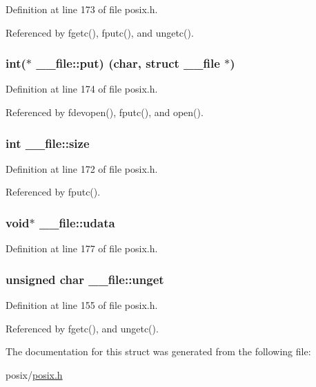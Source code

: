 Definition at line 173 of file posix.\+h.



Referenced by fgetc(), fputc(), and ungetc().

\subsubsection[{\texorpdfstring{put}{put}}]{\setlength{\rightskip}{0pt plus 5cm}int($\ast$ \+\_\+\+\_\+file\+::put) (char, struct {\bf \+\_\+\+\_\+file} $\ast$)}\hypertarget{struct____file_a01c8b217e42cc11b6a7f8429114e9d46}{}\label{struct____file_a01c8b217e42cc11b6a7f8429114e9d46}


Definition at line 174 of file posix.\+h.



Referenced by fdevopen(), fputc(), and open().

\subsubsection[{\texorpdfstring{size}{size}}]{\setlength{\rightskip}{0pt plus 5cm}int \+\_\+\+\_\+file\+::size}\hypertarget{struct____file_aff4a1ca8b6a12460812928afae81248d}{}\label{struct____file_aff4a1ca8b6a12460812928afae81248d}


Definition at line 172 of file posix.\+h.



Referenced by fputc().

\subsubsection[{\texorpdfstring{udata}{udata}}]{\setlength{\rightskip}{0pt plus 5cm}void$\ast$ \+\_\+\+\_\+file\+::udata}\hypertarget{struct____file_abe6f3bdb4df4119277132eb3e13a4628}{}\label{struct____file_abe6f3bdb4df4119277132eb3e13a4628}


Definition at line 177 of file posix.\+h.

\subsubsection[{\texorpdfstring{unget}{unget}}]{\setlength{\rightskip}{0pt plus 5cm}unsigned char \+\_\+\+\_\+file\+::unget}\hypertarget{struct____file_a1d139ae3cb11a1fada469a49f7d3d3b6}{}\label{struct____file_a1d139ae3cb11a1fada469a49f7d3d3b6}


Definition at line 155 of file posix.\+h.



Referenced by fgetc(), and ungetc().



The documentation for this struct was generated from the following file\+:\begin{DoxyCompactItemize}
\item 
posix/\hyperlink{posix_8h}{posix.\+h}\end{DoxyCompactItemize}
